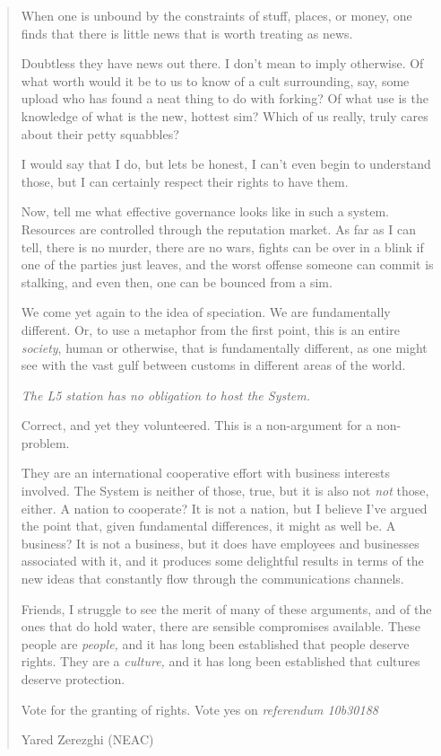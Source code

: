 \begin{quote}
When one is unbound by the constraints of stuff, places, or money, one finds that there is little news that is worth treating as news.

Doubtless they have news out there. I don't mean to imply otherwise. Of what worth would it be to us to know of a cult surrounding, say, some upload who has found a neat thing to do with forking? Of what use is the knowledge of what is the new, hottest sim? Which of us really, truly cares about their petty squabbles?

I would say that I do, but lets be honest, I can't even begin to understand those, but I can certainly respect their rights to have them.

Now, tell me what effective governance looks like in such a system. Resources are controlled through the reputation market. As far as I can tell, there is no murder, there are no wars, fights can be over in a blink if one of the parties just leaves, and the worst offense someone can commit is stalking, and even then, one can be bounced from a sim.

We come yet again to the idea of speciation. We are fundamentally different. Or, to use a metaphor from the first point, this is an entire \emph{society}, human or otherwise, that is fundamentally different, as one might see with the vast gulf between customs in different areas of the world.

\emph{The L5 station has no obligation to host the System.}

Correct, and yet they volunteered. This is a non-argument for a non-problem.

They are an international cooperative effort with business interests involved. The System is neither of those, true, but it is also not \emph{not} those, either. A nation to cooperate? It is not a nation, but I believe I've argued the point that, given fundamental differences, it might as well be. A business? It is not a business, but it does have employees and businesses associated with it, and it produces some delightful results in terms of the new ideas that constantly flow through the communications channels.

Friends, I struggle to see the merit of many of these arguments, and of the ones that do hold water, there are sensible compromises available. These people are \emph{people,} and it has long been established that people deserve rights. They are a \emph{culture,} and it has long been established that cultures deserve protection.

Vote for the granting of rights. Vote yes on \emph{referendum 10b30188}

Yared Zerezghi (NEAC)
\end{quote}
